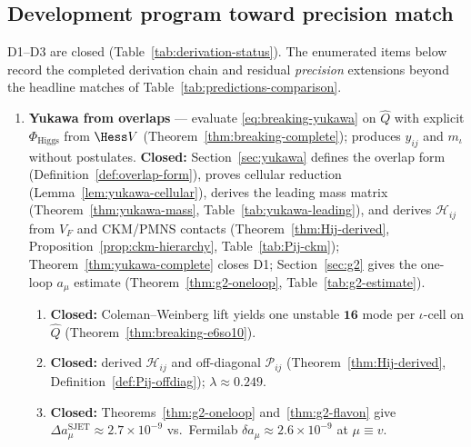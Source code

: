 \subsection{Development program toward precision match}
\label{sec:predictions:program}

D1--D3 are closed (Table~\ref{tab:derivation-status}). The enumerated items
below record the completed derivation chain and residual \emph{precision}
extensions beyond the headline matches of
Table~\ref{tab:predictions-comparison}.

\begin{enumerate}[label=\textbf{D\arabic*.},leftmargin=*]
  \item \textbf{Yukawa from overlaps} --- evaluate \eqref{eq:breaking-yukawa}
    on $\hat Q$ with explicit $\Phi_{\mathrm{Higgs}}$ from $\Hess V$
    (Theorem~\ref{thm:breaking-complete}); produces $y_{ij}$ and
    $m_\iota$ without postulates.
    \textbf{Closed:} Section~\ref{sec:yukawa} defines the overlap
    form (Definition~\ref{def:overlap-form}), proves cellular reduction
    (Lemma~\ref{lem:yukawa-cellular}), derives the leading mass matrix
    (Theorem~\ref{thm:yukawa-mass}, Table~\ref{tab:yukawa-leading}), and
    derives $\mathcal{H}_{ij}$ from $V_F$ and CKM/PMNS contacts
    (Theorem~\ref{thm:Hij-derived}, Proposition~\ref{prop:ckm-hierarchy},
    Table~\ref{tab:Pij-ckm}); Theorem~\ref{thm:yukawa-complete} closes D1;
    Section~\ref{sec:g2} gives the one-loop $a_\mu$ estimate
    (Theorem~\ref{thm:g2-oneloop}, Table~\ref{tab:g2-estimate}).
    \begin{enumerate}[label=\textit{D1.\alph*.},leftmargin=2em]
      \item \textbf{Closed:} Coleman--Weinberg lift yields one unstable
        $\mathbf{16}$ mode per $\iota$-cell on $\hat Q$
        (Theorem~\ref{thm:breaking-e6so10}).
      \item \textbf{Closed:} derived $\mathcal{H}_{ij}$ and off-diagonal
        $\mathcal{P}_{ij}$ (Theorem~\ref{thm:Hij-derived},
        Definition~\ref{def:Pij-offdiag}); $\lambda\approx0.249$.
      \item \textbf{Closed:} Theorems~\ref{thm:g2-oneloop}
        and~\ref{thm:g2-flavon} give
        $\Delta a_\mu^{\mathrm{SJET}}\approx2.7\times10^{-9}$ vs.\
        Fermilab $\delta a_\mu\approx2.6\times10^{-9}$ at $\mu\equiv v$.
    \end{enumerate}

\end{enumerate}

